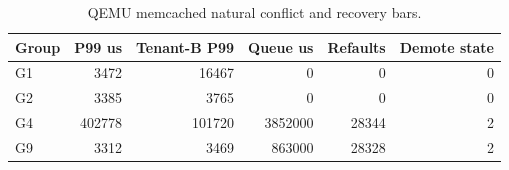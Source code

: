 
\begin{table}[t]
\centering
\scriptsize
\caption{QEMU memcached natural conflict and recovery bars.}
\begin{tabular}{lrrrrr}
\toprule
Group & P99 us & Tenant-B P99 & Queue us & Refaults & Demote state \\
\midrule
G1 & 3472 & 16467 & 0 & 0 & 0 \\
G2 & 3385 & 3765 & 0 & 0 & 0 \\
G4 & 402778 & 101720 & 3852000 & 28344 & 2 \\
G9 & 3312 & 3469 & 863000 & 28328 & 2 \\
\bottomrule
\end{tabular}
\end{table}

